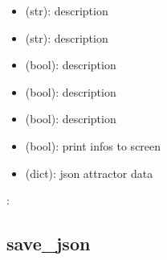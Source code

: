 \documentclass[letterpaper,10pt,english]{sphinxmanual}
\begin{document}
\begin{fulllineitems}
\begin{description}
\begin{itemize}
\item {} 
 (str): description

\item {} 
 (str): description

\item {} 
 (bool): description

\item {} 
 (bool): description

\item {} 
 (bool): description

\item {} 
 (bool): print infos to screen

\end{itemize}

\item[{\sphinxstylestrong{returns}:}] \leavevmode\begin{itemize}
\item {} 
 (dict): json attractor data

\end{itemize}

\end{description}

:

\begin{sphinxVerbatim}[commandchars=\\\{\}]
    
\end{sphinxVerbatim}

\end{fulllineitems}



\subsection{save\_json}
\label{\detokenize{Attractors:attractors-save-json}}\label{\detokenize{Attractors:save-json}}
\end{document}
